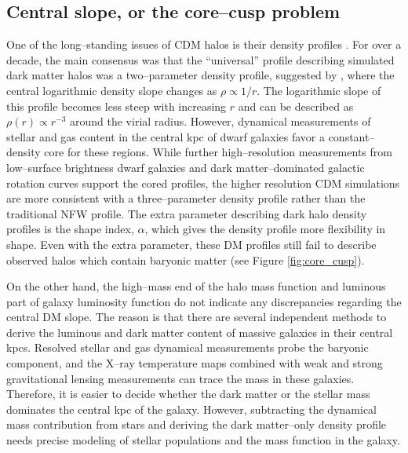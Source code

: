 \documentclass[a4wide,12pt]{book}
\begin{document}
\subsection{Central slope, or the core--cusp problem}
\label{subsec:core-cusp}
One of the long--standing issues of CDM halos is their density profiles \citep[][]{Dubinski.Carlberg1991, Walker.Penarrubia2011}. For over a decade, the main consensus was that the ``universal'' profile describing simulated dark matter halos was a two--parameter density profile, suggested by \citet[][ hereafter NFW]{NFW96}, where the central logarithmic density slope changes as $\rho \propto 1/r$. The logarithmic slope of this profile becomes less steep with increasing $r$ and can be described as $\rho(r) \propto r^{-3}$ around the virial radius. However, dynamical measurements of stellar and gas content in the central kpc of dwarf galaxies \citep[][]{Oh+2011} favor a constant--density core for these regions. While further high--resolution measurements from low--surface brightness dwarf galaxies and dark matter--dominated galactic rotation curves support the cored profiles, the higher resolution CDM simulations are more consistent with a three--parameter density profile rather than the traditional NFW profile. The extra parameter describing dark halo density profiles is the shape index, $\alpha$, which gives the density profile more flexibility in shape. Even with the extra parameter, these DM profiles still fail to describe observed halos which contain baryonic matter (see Figure \ref{fig:core_cusp}).

On the other hand, the high--mass end of the halo mass function and luminous part of galaxy luminosity function do not indicate any discrepancies regarding the central DM slope. The reason is that there are several independent methods to derive the luminous and dark matter content of massive galaxies in their central kpcs. Resolved stellar and gas dynamical measurements probe the baryonic component, and the X--ray temperature maps combined with weak and strong gravitational lensing measurements can trace the mass in these galaxies. Therefore, it is easier to decide whether the dark matter or the stellar mass dominates the central kpc of the galaxy. 
 However, subtracting the dynamical mass contribution from stars and deriving the dark matter--only density profile needs precise modeling of stellar populations and the mass function in the galaxy. 
\end{document}
